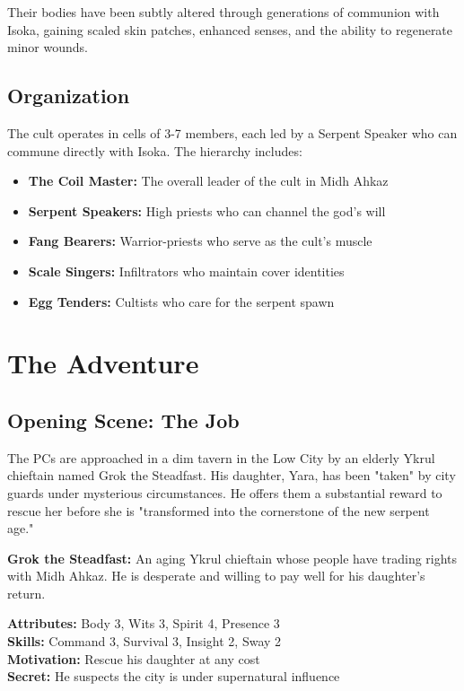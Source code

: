 \documentclass[12pt,twoside]{article}
\begin{document}
Their bodies have been subtly altered through generations of communion with Isoka, gaining scaled skin patches, enhanced senses, and the ability to regenerate minor wounds.

\subsection{Organization}

The cult operates in cells of 3-7 members, each led by a Serpent Speaker who can commune directly with Isoka. The hierarchy includes:
\begin{itemize}
  \item \textbf{The Coil Master:} The overall leader of the cult in Midh Ahkaz
  \item \textbf{Serpent Speakers:} High priests who can channel the god's will
  \item \textbf{Fang Bearers:} Warrior-priests who serve as the cult's muscle
  \item \textbf{Scale Singers:} Infiltrators who maintain cover identities
  \item \textbf{Egg Tenders:} Cultists who care for the serpent spawn
\end{itemize}

\section{The Adventure}

\subsection{Opening Scene: The Job}

The PCs are approached in a dim tavern in the Low City by an elderly Ykrul chieftain named Grok the Steadfast. His daughter, Yara, has been "taken" by city guards under mysterious circumstances. He offers them a substantial reward to rescue her before she is "transformed into the cornerstone of the new serpent age."

\textbf{Grok the Steadfast:}
An aging Ykrul chieftain whose people have trading rights with Midh Ahkaz. He is desperate and willing to pay well for his daughter's return.

\textbf{Attributes:} Body 3, Wits 3, Spirit 4, Presence 3 \\
\textbf{Skills:} Command 3, Survival 3, Insight 2, Sway 2 \\
\textbf{Motivation:} Rescue his daughter at any cost \\
\textbf{Secret:} He suspects the city is under supernatural influence
\end{document}
